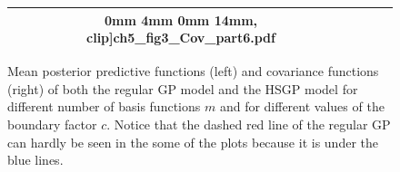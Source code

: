 \documentclass[onecolumn,a4paper,11pt]{article}
\begin{document}
\begin{figure}
\begin{center}
\begin{tabular}{| c | c | c | c |}
0mm 4mm 0mm 14mm, clip]{ch5_fig3_Cov_part6.pdf} &\\
\hline
\end{tabular}
\end{center}
\caption{Mean posterior predictive functions (left) and covariance functions (right) of both the regular GP model and the HSGP model for different number of basis functions $m$ and for different values of the boundary factor $c$. Notice that the dashed red line of the regular GP can hardly be seen in the some of the plots because it is under the blue lines.}
  \label{fig3_Post_part1}
\end{figure}
\end{document}

